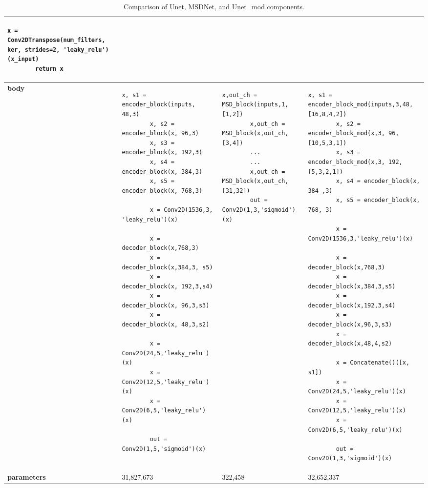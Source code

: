 \begin{table}[h!]
\begin{tabular}{|>{\centering\arraybackslash\bfseries}p{1.2cm}|p{4.5cm}|p{4.5cm}|p{4.5cm}|}
\begin{lstlisting}[basicstyle=\tiny\ttfamily, xleftmargin=-1em]
        x = Conv2DTranspose(num_filters, ker, strides=2, 'leaky_relu')(x_input)
        return x
    \end{lstlisting} \\ \hline
    
    body & 
    \begin{lstlisting}[basicstyle=\tiny\ttfamily, xleftmargin=-1em]
        x, s1 = encoder_block(inputs, 48,3)        
        x, s2 = encoder_block(x, 96,3)             
        x, s3 = encoder_block(x, 192,3)           
        x, s4 = encoder_block(x, 384,3)           
        x, s5 = encoder_block(x, 768,3)          
    
        x = Conv2D(1536,3, 'leaky_relu')(x) 
    
        x = decoder_block(x,768,3)
        x = decoder_block(x,384,3, s5)
        x = decoder_block(x, 192,3,s4)
        x = decoder_block(x, 96,3,s3)
        x = decoder_block(x, 48,3,s2)
        
        x = Conv2D(24,5,'leaky_relu')(x) 
        x = Conv2D(12,5,'leaky_relu')(x)
        x = Conv2D(6,5,'leaky_relu')(x)
        
        out = Conv2D(1,5,'sigmoid')(x)
    \end{lstlisting} 
    & 
    \begin{lstlisting}[basicstyle=\tiny\ttfamily, xleftmargin=-1em]
        x,out_ch = MSD_block(inputs,1,[1,2])
        x,out_ch = MSD_block(x,out_ch,[3,4])
        ...
        ...
        x,out_ch = MSD_block(x,out_ch,[31,32])
        out = Conv2D(1,3,'sigmoid')(x)
    \end{lstlisting} 
    &
    \begin{lstlisting}[basicstyle=\tiny\ttfamily, xleftmargin=-1em]
        x, s1 = encoder_block_mod(inputs,3,48,[16,8,4,2])   
        x, s2 = encoder_block_mod(x,3, 96,[10,5,3,1])       
        x, s3 = encoder_block_mod(x,3, 192,[5,3,2,1])           
        x, s4 = encoder_block(x, 384 ,3)            
        x, s5 = encoder_block(x, 768, 3)                    
        
        x = Conv2D(1536,3,'leaky_relu')(x)
        
        x = decoder_block(x,768,3)    
        x = decoder_block(x,384,3,s5)  
        x = decoder_block(x,192,3,s4)  
        x = decoder_block(x,96,3,s3) 
        x = decoder_block(x,48,4,s2)  
    
        x = Concatenate()([x, s1])
        x = Conv2D(24,5,'leaky_relu')(x) 
        x = Conv2D(12,5,'leaky_relu')(x)   
        x = Conv2D(6,5,'leaky_relu')(x)
    
        out = Conv2D(1,3,'sigmoid')(x)
    \end{lstlisting} \\ \hline
    parameters & 31,827,673 & 322,458 & 32,652,337 \\ \hline
    \end{tabular}
    \caption{Comparison of Unet, MSDNet, and Unet\_mod components.}
    \label{tab:model_comparison}
\end{table}

